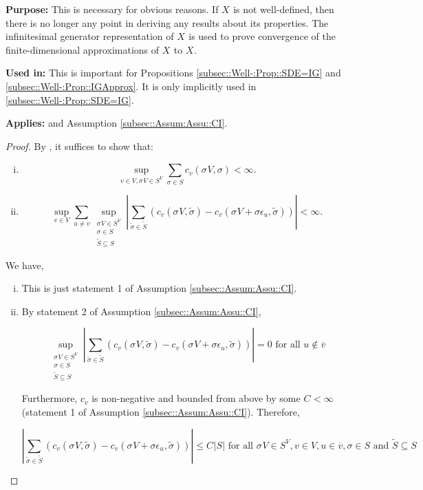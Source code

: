 \documentclass[12pt]{article}
\newcommand{\ov}{\overline}
\newcommand{\te}{\text}
\newcommand{\ep}{\epsilon}
\newcommand{\purpose}{\textbf{Purpose: }}
\newcommand{\usein}{\textbf{Used in: }}
\newcommand{\app}{\textbf{Applies: }}
\renewcommand{\v}{v}							%
\newcommand{\vv}{u}								%
\newcommand{\cl}{\ov}							%
\renewcommand{\S}{S}							%
\newcommand{\s}{\sigma}							%
\newcommand{\sv}[1]{\s^{#1}}					%
\newcommand{\ev}[1]{\ep_{#1}}					%
\renewcommand{\SS}{\tilde{\S}}						%
\renewcommand{\ss}{\tilde{\s}}					%
\newcommand{\V}{V}									%
\newcommand{\XState}[1]{\S^{#1}}				%
\newcommand{\rxvts}[2]{X_{#1}{#2}}					%
\newcommand{\IGr}[1]{c_{#1}}						%
\newcommand{\const}[1]{C_{#1}}						%
\begin{document}
\purpose This is necessary for obvious reasons. If \(\rxvts{}{}\) is not well-defined, then there is no longer any point in deriving any results about its properties. The infinitesimal generator representation of \(\rxvts{}{}\) is used to prove convergence of the finite-dimensional approximations of \(\rxvts{}{}\) to \(\rxvts{}{}\).

\usein This is important for Propositions \ref{subsec::Well-:Prop::SDE=IG} and \ref{subsec::Well-:Prop::IGApprox}. It is only implicitly used in \ref{subsec::Well-:Prop::SDE=IG}.

\app \cite[Theorem 3.9]{Lig85} and Assumption \ref{subsec::Assum:Assu::CI}.

\begin{proof}
By \cite[Theorem 3.9 (a) and (b)]{Lig85}, it suffices to show that:

\begin{enumerate}[i)]
\item 

\[\sup_{\v \in \V,\sv{}{\V} \in \S^\V} \sum_{\s \in \S} \IGr{\v}(\sv{}{\V},\s) < \infty.\]

\item 

\[\sup_{\v\in \V}\sum_{\vv\neq \v} \sup_{\substack{\sv{}{\V} \in \S^\V\\ \s\in \S\\ \SS \subseteq \S}} \left|\sum_{\ss \in \SS} (\IGr{\v}(\sv{}{\V},\ss) - \IGr{\v}(\sv{}{\V}+\s \ev{\vv},\ss))\right| < \infty.\]
\end{enumerate}

We have,

\begin{enumerate}[i)]
\item This is just statement 1 of Assumption \ref{subsec::Assum:Assu::CI}.

\item By statement 2 of Assumption \ref{subsec::Assum:Assu::CI}, 

\[\sup_{\substack{\sv{}{\V} \in \S^\V\\ \s\in \S\\ \SS\subseteq \S}} \left|\sum_{\ss \in \SS} (\IGr{\v}(\sv{}{\V},\ss) - \IGr{\v}(\sv{}{\V}+\s \ev{\vv},\ss))\right| = 0 \te{ for all } \vv \notin \cl{\v}\]

Furthermore, \(\IGr{\v}\) is non-negative and bounded from above by some \(\const{} < \infty\) (statement 1 of Assumption \ref{subsec::Assum:Assu::CI}). Therefore, 

\[\left|\sum_{\ss \in \SS} (\IGr{\v}(\sv{}{\V},\ss) - \IGr{\v}(\sv{}{\V}+\s\ev{\vv},\ss))\right| \leq \const{}|\S| \te{ for all } \sv{}{\V} \in \S^\V,\v \in \V, \vv \in \cl{\v}, \s \in \S \te{ and } \SS\subseteq \S\]


\end{enumerate}
\end{proof}
\end{document}
